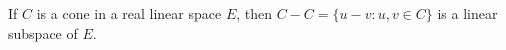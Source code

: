 If $C$ is a cone in a real linear space $E$, then $C - C = \{u - v : u, v \in C\}$ is a linear subspace of $E$.
